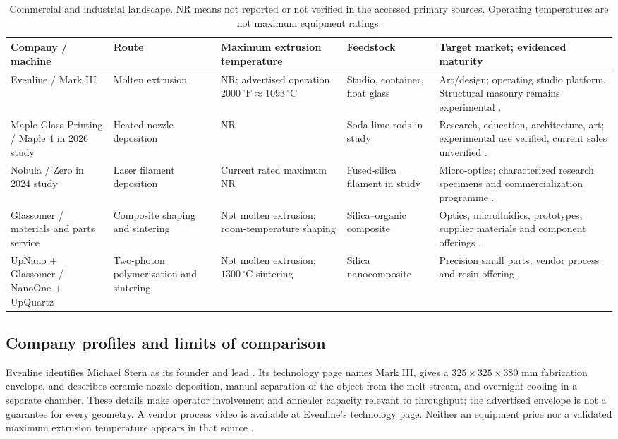 \begin{table}[htbp]
\centering
\caption{Commercial and industrial landscape. NR means not reported or not verified in the accessed primary sources. Operating temperatures are not maximum equipment ratings.}
\label{tab:commercial}
\scriptsize
\begin{tabularx}{\textwidth}{@{}P{0.14\textwidth}P{0.13\textwidth}P{0.17\textwidth}P{0.15\textwidth}Y@{}}
\toprule
Company / machine & Route & Maximum extrusion temperature & Feedstock & Target market; evidenced maturity \\
\midrule
Evenline / Mark III & Molten extrusion & NR; advertised operation $2000\,^{\circ}\mathrm{F}\approx1093\,^{\circ}\mathrm{C}$ & Studio, container, float glass & Art/design; operating studio platform. Structural masonry remains experimental \cite{com_evenline,com_masonry}. \\
Maple Glass Printing / Maple 4 in 2026 study & Heated-nozzle deposition & NR & Soda-lime rods in study & Research, education, architecture, art; experimental use verified, current sales unverified \cite{com_maple,acad_chhadeh2026}. \\
Nobula / Zero in 2024 study & Laser filament deposition & Current rated maximum NR & Fused-silica filament in study & Micro-optics; characterized research specimens and commercialization programme \cite{com_liu,com_nobulagrant}. \\
Glassomer / materials and parts service & Composite shaping and sintering & Not molten extrusion; room-temperature shaping & Silica--organic composite & Optics, microfluidics, prototypes; supplier materials and component offerings \cite{com_glassomer}. \\
UpNano + Glassomer / NanoOne + UpQuartz & Two-photon polymerization and sintering & Not molten extrusion; $1300\,^{\circ}\mathrm{C}$ sintering & Silica nanocomposite & Precision small parts; vendor process and resin offering \cite{com_upnano}. \\
\bottomrule
\end{tabularx}
\end{table}

\subsection{Company profiles and limits of comparison}
Evenline identifies Michael Stern as its founder and lead \cite{com_evenlinepeople}. Its technology page names Mark III, gives a $325\times325\times380$ mm fabrication envelope, and describes ceramic-nozzle deposition, manual separation of the object from the melt stream, and overnight cooling in a separate chamber. These details make operator involvement and annealer capacity relevant to throughput; the advertised envelope is not a guarantee for every geometry. A vendor process video is available at \href{https://www.evenline.co/technology}{Evenline's technology page}. Neither an equipment price nor a validated maximum extrusion temperature appears in that source \cite{com_evenline}.

